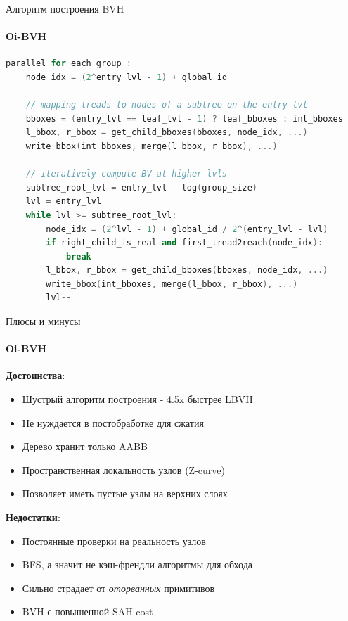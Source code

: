 \begin{frame}[fragile]{Алгоритм построения BVH}
    \framesubtitle{Oi-BVH}
    \begin{adjustbox}{width=\textwidth, keepaspectratio}
        \begin{lstlisting}[language=C++,basicstyle=\ttfamily,keywordstyle=\color{blue}]
parallel for each group :
    node_idx = (2^entry_lvl - 1) + global_id

    // mapping treads to nodes of a subtree on the entry lvl
    bboxes = (entry_lvl == leaf_lvl - 1) ? leaf_bboxes : int_bboxes
    l_bbox, r_bbox = get_child_bboxes(bboxes, node_idx, ...)
    write_bbox(int_bboxes, merge(l_bbox, r_bbox), ...)

    // iteratively compute BV at higher lvls
    subtree_root_lvl = entry_lvl - log(group_size)
    lvl = entry_lvl
    while lvl >= subtree_root_lvl:
        node_idx = (2^lvl - 1) + global_id / 2^(entry_lvl - lvl)
        if right_child_is_real and first_tread2reach(node_idx):
            break
        l_bbox, r_bbox = get_child_bboxes(bboxes, node_idx, ...)
        write_bbox(int_bboxes, merge(l_bbox, r_bbox), ...)
        lvl--
        \end{lstlisting}
    \end{adjustbox}

\end{frame}

\begin{frame}{Плюсы и минусы}
    \framesubtitle{Oi-BVH}

    \textbf{Достоинства}:
    \begin{itemize}
        \item
            Шустрый алгоритм построения - 4.5x быстрее LBVH
        \item
            Не нуждается в постобработке для сжатия
        \item
            Дерево хранит только AABB
        \item
            Пространственная локальность узлов (Z-curve)
        \item
            Позволяет иметь пустые узлы на верхних слоях
    \end{itemize}

    \textbf{Недостатки}:
    \begin{itemize}
        \item
            Постоянные проверки на реальность узлов
        \item
            BFS, а значит не кэш-френдли алгоритмы для обхода
        \item
            Сильно страдает от \textit{оторванных} примитивов
        \item
            BVH с повышенной SAH-cost
    \end{itemize}

\end{frame}

